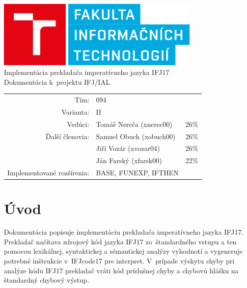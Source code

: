 \documentclass{article}
\begin{document}
    \begin{titlepage}
        \begin{center}
            
            \includegraphics[width=10cm]{FITlogo.png}\\[30mm]
            
            \LARGE
            Implementácia prekladača imperatívneho jazyka IFJ17 \\
            \large
            Dokumentácia k~projektu IFJ/IAL\\[55mm]
            
            \begin{tabular}{r l l}
                Tím: & 094 & \\
                Varianta: & II & \\
                Vedúci: & Tomáš Nereča (xnerec00) & 26\% \\
                Ďalší členovia: & Samuel Obuch (xobuch00) & 26\% \\
                    & Jiří Vozár (xvozar04) & 26\% \\
                    & Ján Farský (xfarsk00) & 22\% \\
                Implementované rozšírenia: & BASE, FUNEXP, IFTHEN &\\
            \end{tabular}
            
        \end{center}
    \end{titlepage}

    \tableofcontents
    \newpage
    
    \section{Úvod}
        Dokumentácia popisuje implementáciu prekladača imperatívneho jazyka IFJ17. Prekladač načítava
        zdrojový kód jazyka IFJ17 zo~štandardného vstupu a ten pomocou lexikálnej, syntaktickej a sémantickej
        analýzy vyhodnotí a vygeneruje potrebné inštrukcie v~IFJcode17 pre interpret. V~prípade
        výskytu chyby pri analýze kódu IFJ17 prekladač vráti kód príslušnej chyby a chybovú hlášku na štandardný
        chybový výstup.
        
\end{document}
